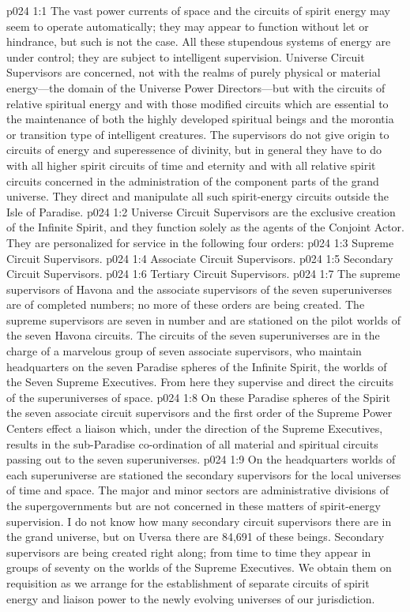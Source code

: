 \vs p024 1:1 The vast power currents of space and the circuits of spirit energy may seem to operate automatically; they may appear to function without let or hindrance, but such is not the case. All these stupendous systems of energy are under control; they are subject to intelligent supervision. Universe Circuit Supervisors are concerned, not with the realms of purely physical or material energy---the domain of the Universe Power Directors---but with the circuits of relative spiritual energy and with those modified circuits which are essential to the maintenance of both the highly developed spiritual beings and the morontia or transition type of intelligent creatures. The supervisors do not give origin to circuits of energy and superessence of divinity, but in general they have to do with all higher spirit circuits of time and eternity and with all relative spirit circuits concerned in the administration of the component parts of the grand universe. They direct and manipulate all such spirit\hyp{}energy circuits outside the Isle of Paradise.\plusone
\pc \vs p024 1:2 Universe Circuit Supervisors are the exclusive creation of the Infinite Spirit, and they function solely as the agents of the Conjoint Actor. They are personalized for service in the following four orders:
\pc \vs p024 1:3 \bibnobreakspace Supreme Circuit Supervisors.
\vs p024 1:4 \bibnobreakspace Associate Circuit Supervisors.
\vs p024 1:5 \bibnobreakspace Secondary Circuit Supervisors.
\vs p024 1:6 \bibnobreakspace Tertiary Circuit Supervisors.
\pc \vs p024 1:7 The supreme supervisors of Havona and the associate supervisors of the seven superuniverses are of completed numbers; no more of these orders are being created. The supreme supervisors are seven in number and are stationed on the pilot worlds of the seven Havona circuits. The circuits of the seven superuniverses are in the charge of a marvelous group of seven associate supervisors, who maintain headquarters on the seven Paradise spheres of the Infinite Spirit, the worlds of the Seven Supreme Executives. From here they supervise and direct the circuits of the superuniverses of space.
\vs p024 1:8 On these Paradise spheres of the Spirit the seven associate circuit supervisors and the first order of the Supreme Power Centers effect a liaison which, under the direction of the Supreme Executives, results in the sub\hyp{}Paradise co\hyp{}ordination of all material and spiritual circuits passing out to the seven superuniverses.
\vs p024 1:9 On the headquarters worlds of each superuniverse are stationed the secondary supervisors for the local universes of time and space. The major and minor sectors are administrative divisions of the supergovernments but are not concerned in these matters of spirit\hyp{}energy supervision. I do not know how many secondary circuit supervisors there are in the grand universe, but on Uversa there are 84,691 of these beings. Secondary supervisors are being created right along; from time to time they appear in groups of seventy on the worlds of the Supreme Executives. We obtain them on requisition as we arrange for the establishment of separate circuits of spirit energy and liaison power to the newly evolving universes of our jurisdiction.
